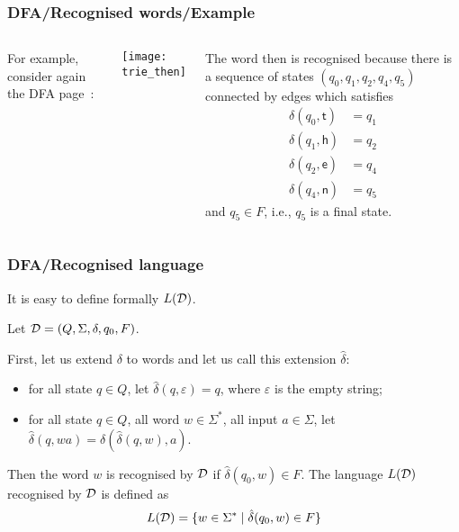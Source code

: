 % 
\begin{frame}
\frametitle{DFA/Recognised words/Example}

\begin{columns}

   For example, consider again the DFA
  page~\pageref{trie_then}:
  \begin{center}
    \texttt{[image: trie\_then]}
  \end{center}

   The word \textsf{then} is recognised because
  there is a sequence of states \((q_0, q_1, q_2, q_4, q_5)\)
  connected by edges which satisfies
  \begin{align*}
    \delta (q_0, \textsf{t}) &= q_1\\
    \delta (q_1, \textsf{h}) &= q_2\\
    \delta (q_2, \textsf{e}) &= q_4\\
    \delta (q_4, \textsf{n}) &= q_5
  \end{align*}
  and \(q_5 \in F\), i.e., \(q_5\) is a final state.

\end{columns}

\end{frame}

% 
\begin{frame}
\frametitle{DFA/Recognised language}

It is easy to define formally \(L({\cal D})\).

\bigskip

Let \({\cal D} = (Q, \Sigma, \delta, q_0, F)\).

\bigskip

First, let us extend \(\delta\) to words and let us call this
extension \(\hat{\delta}\):
\begin{itemize}

  \item for all state \(q \in Q\), let \(\hat{\delta} (q,
  \varepsilon) = q\), where \(\varepsilon\) is the empty string;

  \item for all state \(q \in Q\), all word \(w \in \Sigma^{*}\), all
 input \(a \in \Sigma\), let \(\hat{\delta} (q, wa) = \delta
 (\hat{\delta}(q,w),a)\).

\end{itemize}
Then the word \(w\) is recognised by \(\cal D\) if \(\hat{\delta}(q_0,
w) \in F\). The language \(L({\cal D})\) recognised by \(\cal D\) is
defined as
\[
L({\cal D}) = \{w \in \Sigma^{*} \; \lvert \; \hat{\delta}(q_0, w) \in F\}
\]

\end{frame}

